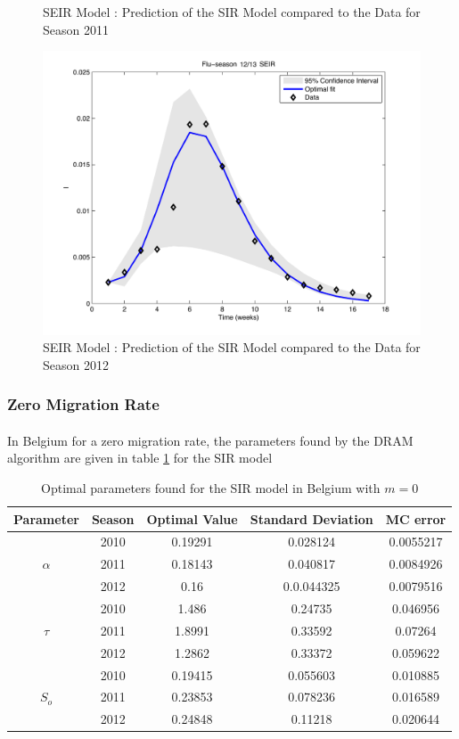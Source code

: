 \documentclass[11pt, a4paper]{article}
\begin{document}
\begin{figure}[h]
    \caption{SEIR Model : Prediction of the SIR Model compared to the Data for Season 2011}
    \label{fig:seir_pred2}
    \includegraphics[height = 0.25\textheight]{figures/SEIR_prediction_season3.pdf}
    \caption{SEIR Model : Prediction of the SIR Model compared to the Data for Season 2012}
    \label{fig:seir_pred3}
\end{figure}

\subsubsection{Zero Migration Rate}
\paragraph{}
In Belgium for a zero migration rate, the parameters found by the DRAM algorithm are given in table \ref{tab:sirm0DRAM} for the SIR model
\begin{table}[H]
\FloatBarrier
\centering
\begin{tabular}{| c | c | c | c | c |}
    \hline
    Parameter & Season & Optimal Value &  Standard Deviation & MC error\\ \hline
    \multirow{3}{*}{$\alpha$} & 2010 & 0.19291 & 0.028124 & 0.0055217 \\
    & 2011 & 0.18143 & 0.040817 & 0.0084926 \\
    & 2012 & 0.16 & 0.0.044325 & 0.0079516 \\ \hline
    \multirow{3}{*}{$\tau$} & 2010 & 1.486 & 0.24735 & 0.046956\\ 
    & 2011 & 1.8991 & 0.33592 & 0.07264 \\ 
    & 2012 & 1.2862 & 0.33372 & 0.059622 \\ \hline
    \multirow{3}{*}{$S_o$} & 2010 & 0.19415 & 0.055603 & 0.010885 \\
    & 2011 & 0.23853 & 0.078236 & 0.016589 \\ 
    & 2012 & 0.24848 & 0.11218 & 0.020644 \\ \hline
    \end{tabular}
    \caption{Optimal parameters found for the SIR model in Belgium with $m=0$}
    \label{tab:sirm0DRAM}
\end{table}
\end{document}
